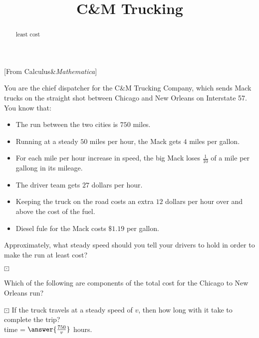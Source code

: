 \documentclass{ximera}
\title{C{\&}M Trucking}
\begin{document}
\begin{abstract}
least cost
\end{abstract}
\maketitle


[From Calculus\&\textit{Mathematica}]




You are the chief dispatcher for the C{\&}M Trucking Company, which sends Mack trucks on the straight shot between Chicago and New Orleans on Interstate 57.  You know that:



\begin{itemize}
\item The run between the two cities is $750$ miles.
\item Running at a steady $50$ miles per hour, the Mack gets $4$ miles per gallon.
\item For each mile per hour increase in speed, the big Mack loses $\frac{1}{10}$ of a mile per gallong in its mileage.
\item The driver team gets $27$ dollars per hour.
\item Keeping the truck on the road costs an extra $12$ dollars per hour over and above the cost of the fuel.
\item Diesel fule for the Mack costs $\$1.19$ per gallon. 
\end{itemize}

Approximately, what steady speed should you tell your drivers to hold in order to make the run at least cost? \\





\begin{question} $\boxdot$

Which of the following are components of the total cost for the Chicago to New Orleans run?

\begin{selectAll}
\end{selectAll}
\end{question}


\begin{question} $\boxdot$
If the truck travels at a steady speed of $v$, then how long with it take to complete the trip? \\

time = $\answer{\frac{750}{v}}$ hours.
\end{question}
\end{document}
